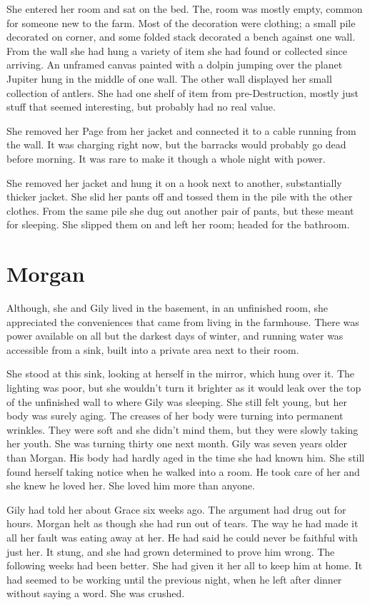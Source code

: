 \documentclass[courier]{sffms}
\begin{document}
She entered her room and sat on the bed. The,
room was mostly empty, common for someone
new to the farm. Most of the decoration were
clothing; a small pile decorated on corner, and
some folded stack decorated a bench against one
wall. From the wall she had hung a variety of item
she had found or collected since arriving. An
unframed canvas painted with a dolpin jumping
over the planet Jupiter hung in the middle of one
wall. The other wall displayed her small collection of
antlers. She had one shelf of item from
pre-Destruction, mostly just stuff that seemed
interesting, but probably had no real value.

She removed her Page from her jacket and
connected it to a cable running from the wall.
It was charging right now, but the barracks would
probably go dead before morning. It was rare to
make it though a whole night with power.

She removed her jacket and hung it on a
hook next to
another, substantially thicker jacket. She slid
her pants off and tossed them in the pile with
the other clothes. From the same pile she dug
out another pair of pants, but these meant for
sleeping. She slipped them on and left her room;
headed for the bathroom.  

\chapter{Morgan}
Although, she and Gily lived in the basement,
in an unfinished room, she appreciated the
conveniences that came from living in the
farmhouse. There was power available on all but the
darkest days of winter, and running water was
accessible from a sink, built into a private
area next to their room.

She stood at this sink, looking at herself in the mirror,
which hung over it. The lighting was poor, but
she wouldn't turn it brighter as it would leak over the
top of the unfinished wall to where Gily was sleeping.
She still felt young, but her body was surely aging.
The creases of her body were turning into permanent
wrinkles. They were soft and she didn't mind them, but
they were slowly taking her youth. She was turning thirty
one next month. Gily was seven years
older than Morgan. His body had
hardly aged in the time she had known him.
She still found herself taking
notice when he walked into a room. He took care of her
and she knew he loved her. She loved him more than
anyone.

Gily had told her about Grace six weeks ago. The
argument had drug out for hours. Morgan helt as
though she had run out of tears. The way he had
made it all her fault was eating away at her. He
had said he could never be faithful with just her.
It stung, and she had grown determined to prove him
wrong. The following weeks had been better. She had
given it her all to keep him at home. It had seemed to be
working until the previous night, when he left after
dinner without saying a word. She was crushed.
\end{document}
